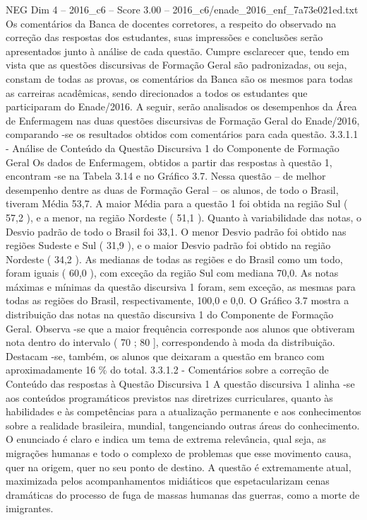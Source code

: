 \begin{textsample}{NEG Dim 4 – 2016\_c6 – Score 3.00 – 2016\_c6/enade\_2016\_enf\_7a73e021ed.txt}
Os comentários da Banca de docentes corretores, a respeito do observado na correção das respostas dos estudantes, suas impressões e conclusões serão apresentados junto à análise de cada questão.
Cumpre esclarecer que, tendo em vista que as questões discursivas de Formação Geral são padronizadas, ou seja, constam de todas as provas, os comentários da Banca são os mesmos para todas as carreiras acadêmicas, sendo direcionados a todos os estudantes que participaram do Enade/2016.
A seguir, serão analisados os desempenhos da Área de Enfermagem nas duas questões discursivas de Formação Geral do Enade/2016, comparando -se os resultados obtidos com comentários para cada questão. 3.3.1.1 - Análise de Conteúdo da Questão Discursiva 1 do Componente de Formação Geral Os dados de Enfermagem, obtidos a partir das respostas à questão 1, encontram -se na Tabela 3.14 e no Gráfico 3.7.
Nessa questão – de melhor desempenho dentre as duas de Formação Geral – os alunos, de todo o Brasil, tiveram Média 53,7.
A maior Média para a questão 1 foi obtida na região Sul ( 57,2 ), e a menor, na região Nordeste ( 51,1 ).
Quanto à variabilidade das notas, o Desvio padrão de todo o Brasil foi 33,1.
O menor Desvio padrão foi obtido nas regiões Sudeste e Sul ( 31,9 ), e o maior Desvio padrão foi obtido na região Nordeste ( 34,2 ).
As medianas de todas as regiões e do Brasil como um todo, foram iguais ( 60,0 ), com exceção da região Sul com mediana 70,0.
As notas máximas e mínimas da questão discursiva 1 foram, sem exceção, as mesmas para todas as regiões do Brasil, respectivamente, 100,0 e 0,0.
O Gráfico 3.7 mostra a distribuição das notas na questão discursiva 1 do Componente de Formação Geral.
Observa -se que a maior frequência corresponde aos alunos que obtiveram nota dentro do intervalo ( 70 ; 80 ], correspondendo à moda da distribuição.
Destacam -se, também, os alunos que deixaram a questão em branco com aproximadamente 16 \% do total. 3.3.1.2 - Comentários sobre a correção de Conteúdo das respostas à Questão Discursiva 1 A questão discursiva 1 alinha -se aos conteúdos programáticos previstos nas diretrizes curriculares, quanto às habilidades e às competências para a atualização permanente e aos conhecimentos sobre a realidade brasileira, mundial, tangenciando outras áreas do conhecimento.
O enunciado é claro e indica um tema de extrema relevância, qual seja, as migrações humanas e todo o complexo de problemas que esse movimento causa, quer na origem, quer no seu ponto de destino.
A questão é extremamente atual, maximizada pelos acompanhamentos midiáticos que espetacularizam cenas dramáticas do processo de fuga de massas humanas das guerras, como a morte de imigrantes.

\end{textsample}

